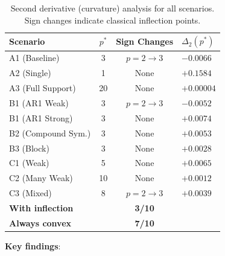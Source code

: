 \documentclass[11pt,a4paper]{article}
\begin{document}
\begin{table}[htbp]
\centering
\caption{Second derivative (curvature) analysis for all scenarios. Sign changes indicate classical inflection points.}
\label{tab:curvature}
\small
\begin{tabular}{@{}lccl@{}}
\toprule
Scenario & $p^*$ & Sign Changes & $\Delta_2(p^*)$ \\
\midrule
A1 (Baseline) & 3 & $p = 2 \to 3$ & $-0.0066$ \\
A2 (Single) & 1 & None & $+0.1584$ \\
A3 (Full Support) & 20 & None & $+0.00004$ \\
B1 (AR1 Weak) & 3 & $p = 2 \to 3$ & $-0.0052$ \\
B1 (AR1 Strong) & 3 & None & $+0.0074$ \\
B2 (Compound Sym.) & 3 & None & $+0.0053$ \\
B3 (Block) & 3 & None & $+0.0028$ \\
C1 (Weak) & 5 & None & $+0.0065$ \\
C2 (Many Weak) & 10 & None & $+0.0012$ \\
C3 (Mixed) & 8 & $p = 2 \to 3$ & $+0.0039$ \\
\midrule
\textbf{With inflection} & & \textbf{3/10} & \\
\textbf{Always convex} & & \textbf{7/10} & \\
\bottomrule
\end{tabular}
\end{table}

\textbf{Key findings}:
\end{document}

